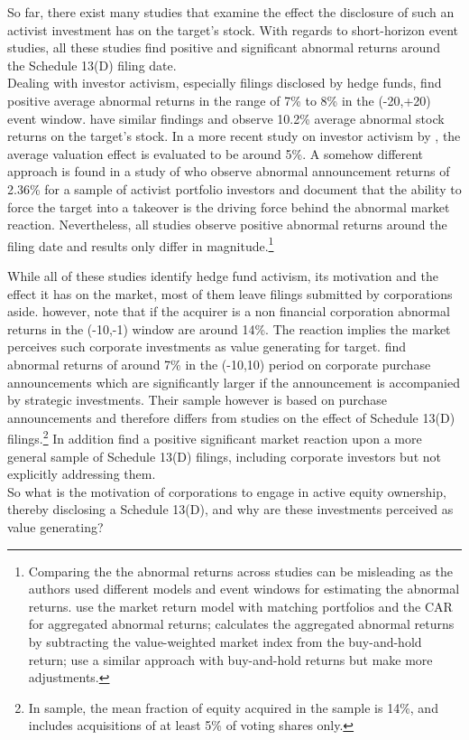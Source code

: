 \documentclass[12pt]{article}
\begin{document}
So far, there exist many studies that examine the effect the disclosure of such an activist investment has on the target's stock. With regards to short-horizon event studies, all these studies find positive and significant abnormal returns around the Schedule 13(D) filing date.\\ 
Dealing with investor activism, especially filings disclosed by hedge funds, \citet[p.1730]{Brav2008} find positive average abnormal returns in the range of 7\% to 8\% in the (-20,+20) event window. \citet[p.188]{Klein2009} have similar findings and observe 10.2\% average abnormal stock returns on the target's stock. In a more recent study on investor activism by \citet[p.410]{Denes2017}, the average valuation effect is evaluated to be around 5\%. A somehow different approach is found in a study of \citet[p.363]{Greenwood2009} who observe abnormal announcement returns of 2.36\% for a sample of activist portfolio investors and document that the ability to force the target into a takeover is the driving force behind the abnormal market reaction. Nevertheless, all studies observe positive abnormal returns around the filing date and results only differ in magnitude.\footnote{Comparing the the abnormal returns across studies can be misleading as the authors used different models and event windows for estimating the abnormal returns. \citet{Greenwood2009} use the market return model with matching portfolios and the CAR for aggregated abnormal returns; \citet{Brav2008} calculates the aggregated abnormal returns by subtracting the value-weighted market index from the buy-and-hold return; \citet{Klein2009} use a similar approach with buy-and-hold returns but make more adjustments.}

While all of these studies identify hedge fund activism, its motivation and the effect it has on the market, most of them leave filings submitted by corporations aside. \citet[p.29]{Brigida2012} however, note that if the acquirer is a non financial corporation abnormal returns in the (-10,-1) window are around 14\%. The reaction implies the market perceives such corporate investments as value generating for target. \citet[p.2803]{Allen2000} find abnormal returns of around 7\% in the (-10,10) period on corporate purchase announcements which are significantly larger if the announcement is accompanied by strategic investments. Their sample however is based on purchase announcements and therefore differs from studies on the effect of Schedule 13(D) filings.\footnote{In \citet[p.2801]{Allen2000} sample, the mean fraction of equity acquired in the sample is 14\%, and includes acquisitions of at least 5\% of voting shares only.} In addition \citet{Collin-Dufresne2015} find a positive significant market reaction upon a more general sample of Schedule 13(D) filings, including corporate investors but not explicitly addressing them.\\
So what is the motivation of corporations to engage in active equity ownership, thereby disclosing a Schedule 13(D), and why are these investments perceived as value generating?
\end{document}
